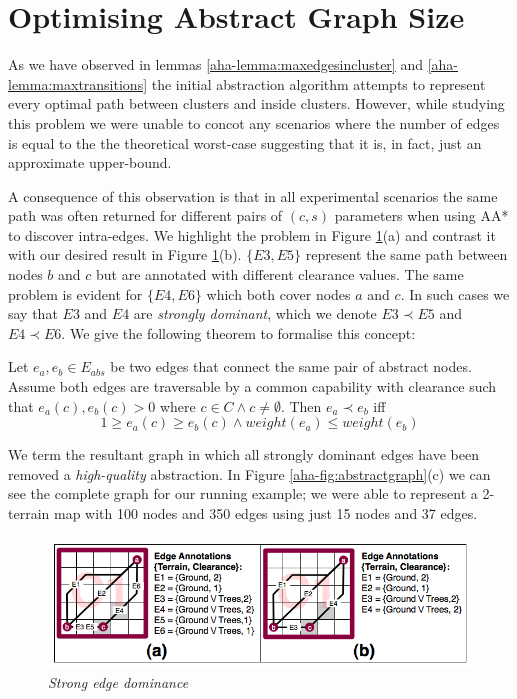 \section{Optimising Abstract Graph Size}
\par \indent
As we have observed in lemmas \ref{aha-lemma:maxedgesincluster} and \ref{aha-lemma:maxtransitions} the initial abstraction algorithm attempts to represent every optimal path between clusters and inside clusters. 
However, while studying this problem we were unable to concot any scenarios where the number of edges is equal to the the theoretical worst-case suggesting that it is, in fact, just an approximate upper-bound.  
\par \indent 
A consequence of this observation is that in all experimental scenarios the same path was often returned for different pairs of $(c, s)$ parameters when using AA* to discover intra-edges. We highlight the problem in Figure \ref{aha-fig:strongdominance}(a) and contrast it with our desired result in Figure \ref{aha-fig:strongdominance}(b). $\lbrace E3, E5 \rbrace$ represent the same path between nodes $b$ and $c$ but are annotated with different clearance values. The same problem is evident for $\lbrace E4, E6 \rbrace$ which both cover nodes $a$ and $c$. In such cases we say that $E3$ and $E4$ are \emph{strongly dominant}, which we denote $E3 \prec E5$ and $E4 \prec E6$. We give the following theorem to formalise this concept:

\begin{theorem}
\label{aha-definition:strongdominance}
Let $e_{a}, e_{b} \in E_{abs}$ be two edges that connect the same pair of abstract nodes. 
Assume both edges are traversable by a common capability with clearance such that $e_{a}(c), e_{b}(c) > 0$ where $c \in C \wedge c \neq \emptyset$. Then $e_{a} \prec e_{b}$ iff
$$ 1 \geq e_{a}(c) \geq e_{b}(c) \wedge weight(e_{a}) \leq weight(e_{b})$$
\end{theorem}

We term the resultant graph in which all strongly dominant edges have been removed a \emph{high-quality} abstraction.  
In Figure \ref{aha-fig:abstractgraph}(c) we can see the complete graph for our running example; we were able to represent a 2-terrain map with 100 nodes and 350 edges using just 15 nodes and  37 edges. 

\begin{figure}[htbp]
        \caption{\emph{Strong edge dominance} }
        \begin{center}
                        \includegraphics[scale=0.3]{diagrams/intraedges_initial.png}
        \end{center}
        \label{aha-fig:strongdominance}
\end{figure}

